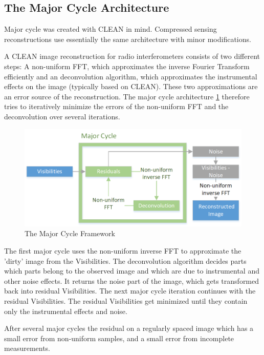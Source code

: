 \subsection{The Major Cycle Architecture}
Major cycle was created with CLEAN in mind. Compressed sensing reconstructions use essentially the same architecture with minor modifications. 

A CLEAN image reconstruction for radio interferometers consists of two different steps: A non-uniform FFT, which approximates the inverse Fourier Transform efficiently and an deconvolution algorithm, which approximates the instrumental effects on the image (typically based on CLEAN). These two approximations are an error source of the reconstruction. The major cycle architecture \ref{intro:major} therefore tries to iteratively minimize the errors of the non-uniform FFT and the deconvolution over several iterations.

\begin{figure}
	\centering
	\vspace{-10pt}
	\includegraphics[width=1.0\linewidth]{./chapters/01.intro/Major-Minor.png}
	\caption{The Major Cycle Framework}
	\label{intro:major}
	\vspace{-10pt}
\end{figure}

The first major cycle uses the non-uniform inverse FFT to approximate the 'dirty' image from the Visibilities. The deconvolution algorithm decides parts which parts belong to the observed image and which are due to instrumental and other noise effects. It returns the noise part of the image, which gets transformed back into residual Visibilities. The next major cycle iteration continues with the residual Visibilities. The residual Visibilities get minimized until they contain only the instrumental effects and noise.

After several major cycles the residual  on a regularly spaced image which has a small error from non-uniform samples, and a small error from incomplete measurements.



